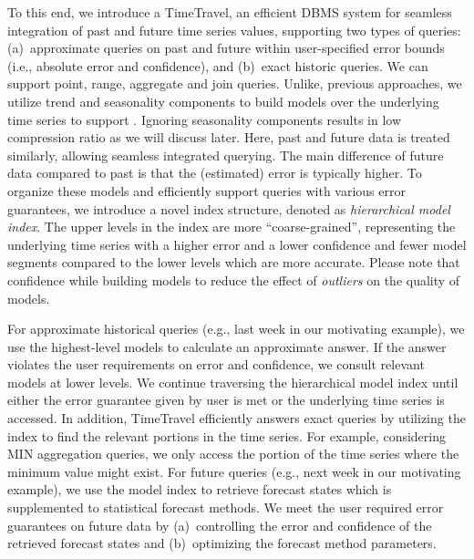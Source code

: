 \documentclass[10pt,conference,letterpaper]{IEEEtran}
\newcommand{\LN}{hierarchical model index}
\begin{document}

To this end, we introduce a  TimeTravel, an efficient DBMS system for seamless integration  of past and future time series values, supporting two types of queries:
(a)~approximate queries on past and future within user-specified error bounds (i.e., absolute error and confidence), and (b)~exact historic queries.
We can support point, range, aggregate and join queries.
Unlike, previous approaches, we utilize trend and seasonality components to build models over the underlying time series to support . Ignoring seasonality components results in low compression ratio as we will discuss later.  Here, past and future data is treated similarly, allowing seamless integrated querying. The main difference of future data compared to past is that the (estimated) error is typically higher.
To organize these models and efficiently support queries with various error guarantees, we introduce a novel index structure, denoted as {\em \LN}.  The upper levels in the index are more ``coarse-grained'', representing 
the underlying time series with a higher error and a lower confidence and fewer model segments compared to the lower levels which are more accurate. Please note that confidence while building models to reduce the effect of  {\it outliers} on the quality of models.

For approximate historical queries (e.g., last week in our motivating example), we use the highest-level models to calculate an approximate answer. If the  answer violates the user requirements on error and confidence, we consult relevant models at lower levels.  We continue traversing the hierarchical model index until either the error guarantee given by user is met or the underlying time series is accessed.
In addition, TimeTravel efficiently answers exact queries by utilizing the index  to find the relevant portions in the time series. For example, considering MIN aggregation queries, we only access the portion of the time series where the minimum value might exist. 
For future queries (e.g., next week in our motivating example), we use the model index to retrieve forecast states which is supplemented to  statistical forecast methods.
We meet the user required error guarantees on future data by (a)~controlling the error and confidence of the  retrieved forecast states and (b)~optimizing the forecast method parameters. 
\end{document}
